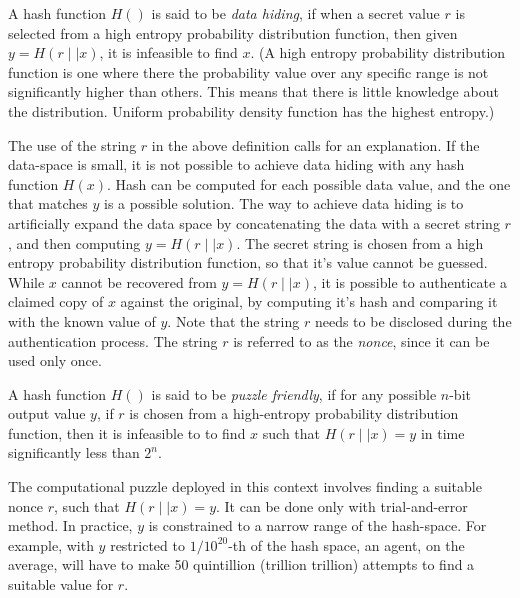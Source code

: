 \begin{definition} 
	A hash function $H()$ is said to be {\em data hiding}, if when a secret value $r$ is selected from a high entropy 
	probability distribution function, then given $y = H(r \mid \mid x)$, it is infeasible to find $x$. 
	(A high entropy probability distribution function is one where there the probability value over any specific range is not 
	significantly higher than others. This means that there is little knowledge about the distribution. Uniform probability 
	density function has the highest entropy.)
\end{definition}

\noindent
The use of the string $r$ in the above definition calls for an explanation. If the data-space is small, it is not possible to 
achieve data hiding with any hash function $H(x)$. Hash can be computed for each possible data value, and the one that 
matches $y$ is a possible solution. The way to achieve data hiding is to artificially expand the data space by concatenating
the data with a secret string $r$, and then computing $y = H(r \mid \mid x)$. The secret string is chosen from a high entropy 
probability distribution function, so that it's value cannot be guessed.
%
While $x$ cannot be recovered from $y = H(r \mid \mid x)$, it is possible to authenticate a claimed copy of $x$ against
the original, by computing it's hash and comparing it with the known value of $y$. Note that the string $r$ needs to be 
disclosed during the authentication process. The string $r$ is referred to as the {\em nonce}, since it can be used only 
once. 

\begin{definition} 
	A hash function $H()$ is said to be {\em puzzle friendly}, if for any possible $n$-bit output value $y$, if $r$ is chosen 
	from a high-entropy probability distribution function, then it is infeasible to to find $x$ such that $H(r \mid \mid x) = y$ 
	in time significantly less than $2^n$.
\end{definition}

The computational puzzle deployed in this context involves finding a suitable nonce $r$, such that $H(r \mid \mid x) = y$.
It can be done only with trial-and-error method. In practice, $y$ is constrained to a narrow range of the hash-space. For example, 
with $y$ restricted to $1/10^{20}$-th of the hash space, an agent, on the average, will have to make 50 quintillion (trillion 
trillion) attempts to find a suitable value for $r$.

